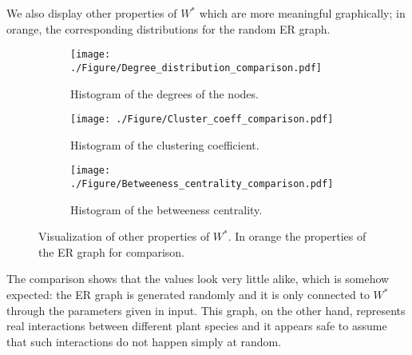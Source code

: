 \documentclass[a4paper,11pt]{article}
\begin{document}
We also display other properties of $W^*$ which are more meaningful graphically; in orange, the corresponding distributions for the random ER graph.
\begin{figure}[htp]
\centering
\begin{subfigure}{.3\textwidth}
  \centering
  \texttt{[image: ./Figure/Degree\_distribution\_comparison.pdf]}
  \caption{Histogram of the degrees of the nodes.}
  \label{fig:degree_distribution}
\end{subfigure}
\begin{subfigure}{.3\textwidth}
  \centering
  \texttt{[image: ./Figure/Cluster\_coeff\_comparison.pdf]}
  \caption{Histogram of the clustering coefficient.}
  \label{fig:cluster_coeff}
\end{subfigure}%
\begin{subfigure}{.3\textwidth}
  \centering
  \texttt{[image: ./Figure/Betweeness\_centrality\_comparison.pdf]}
  \caption{Histogram of the betweeness centrality.}
  \label{fig:betweeness}
\end{subfigure}
\caption{Visualization of other properties of $W^*$. In orange the properties of the ER graph for comparison.}
\label{fig:graph_parameters}
\end{figure}


The comparison shows that the values look very little alike, which is somehow expected: the ER graph is generated randomly and it is only connected to $W^*$ through the parameters given in input. This graph, on the other hand, represents real interactions between different plant species and it appears safe to assume that such interactions do not happen simply at random.


\begin{comment}
SEZIONE DELLE CORREZIONI DI BOTTA
\begin{itemize}
   
    
\end{itemize}
\end{comment}
\end{document}
